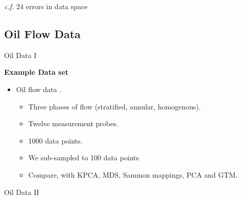 \begin{center}
\emph{c.f.} 24 errors in data space
\par\end{center}


\subsection{Oil Flow Data}

Oil Data I

\textbf{Example Data set}
\begin{itemize}
\item Oil flow data \cite{Bishop:oil93}.

\begin{itemize}
\item Three phases of flow (stratified, annular, homogenous).
\item Twelve measurement probes.
\item 1000 data points.
\item We sub-sampled to 100 data points
\item Compare, with KPCA, MDS, Sammon mappings, PCA and GTM.
\end{itemize}
\end{itemize}
Oil Data II

\begin{center}
%
\begin{figure}
\hfill{}\hfill{}\\
\hfill{}\hfill{}
\end{figure}

\par\end{center}


